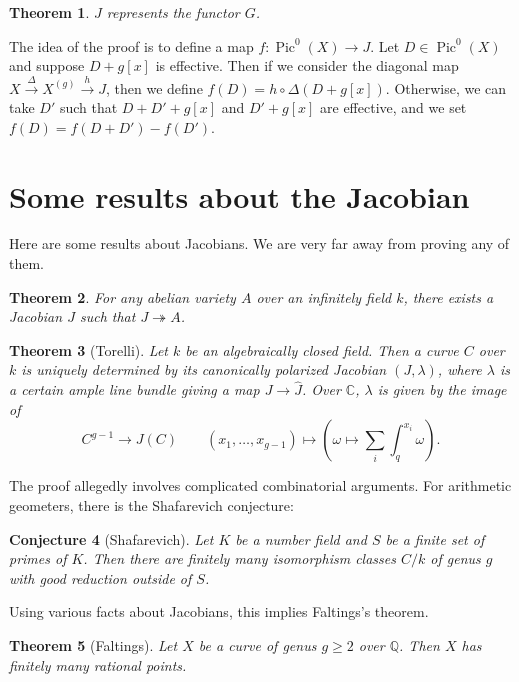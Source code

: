 \documentclass[leqno, openany]{memoir}
\newtheorem{thm}{Theorem}[section]
\newtheorem{conj}[thm]{Conjecture}
\theoremstyle{definition}
\theoremstyle{remark}
\theoremstyle{plain}
\theoremstyle{definition}
\theoremstyle{remark}
\newcommand{\C}{\mathbb{C}}
\newcommand{\Q}{\mathbb{Q}}
\newcommand{\wh}[1]{\widehat{#1}}
\DeclareMathOperator{\Pic}{Pic}
\begin{document}
\begin{thm}
    $J$ represents the functor $G$.
\end{thm}

The idea of the proof is to define a map $f \colon \Pic^0(X) \to J$. Let $D \in \Pic^0(X)$ and suppose $D + g[x]$ is effective. Then if we consider the diagonal map $X \xrightarrow{\Delta} X^{(g)} \xrightarrow{h} J$, then we define $f(D) = h \circ \Delta (D + g[x])$. Otherwise, we can take $D'$ such that $D + D' + g[x]$ and $D' + g[x]$ are effective, and we set $f(D) = f(D + D') - f(D')$.

\section{Some results about the Jacobian}%
\label{sec:some_results_about_the_jacobian}

Here are some results about Jacobians. We are very far away from proving any of them.

\begin{thm}
    For any abelian variety $A$ over an infinitely field $k$, there exists a Jacobian $J$ such that $J \twoheadrightarrow A$.
\end{thm}

\begin{thm}[Torelli]
    Let $k$ be an algebraically closed field. Then a curve $C$ over $k$ is uniquely determined by its canonically polarized Jacobian $(J, \lambda)$, where $\lambda$ is a certain ample line bundle giving a map $J \to \wh{J}$. Over $\C$, $\lambda$ is given by the image of 
    \[ C^{g-1} \to J(C) \qquad (x_1, \ldots, x_{g-1}) \mapsto (\omega \mapsto \sum_i \int_q^{x_i} \omega). \]
\end{thm}

The proof allegedly involves complicated combinatorial arguments. For arithmetic geometers, there is the Shafarevich conjecture:

\begin{conj}[Shafarevich]
    Let $K$ be a number field and $S$ be a finite set of primes of $K$. Then there are finitely many isomorphism classes $C/k$ of genus $g$ with good reduction outside of $S$.
\end{conj}

Using various facts about Jacobians, this implies Faltings's theorem.

\begin{thm}[Faltings]
    Let $X$ be a curve of genus $g \geq 2$ over $\Q$. Then $X$ has finitely many rational points.
\end{thm}
\end{document}
